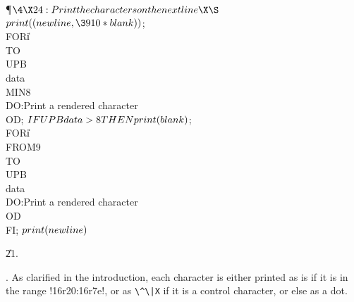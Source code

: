 \Y\P$\4\X24:Print the characters on the next line\X\S$\ $\\{print}((%
\\{newline},\3910\ast\\{blank}))$;\5
\\{FOR}\|i\\{TO}\\{UPB}\\{data}\\{MIN}8\\{DO}:Print a rendered character\X%
\\{OD};\5
$\\{IF}\\{UPB}\\{data}>8\\{THEN}\\{print}(\\{blank})$;\5
\\{FOR}\|i\\{FROM}9\\{TO}\\{UPB}\\{data}\\{DO}:Print a rendered character\X%
\\{OD}\\{FI};\5
$\\{print}(\\{newline})$\par
\U21.\fi

. As clarified in the introduction, each character is either printed
as is if it is in the range !16r20:16r7e!, or as \verb*$\^\|X$ if it
is a control character, or else as a dot.

